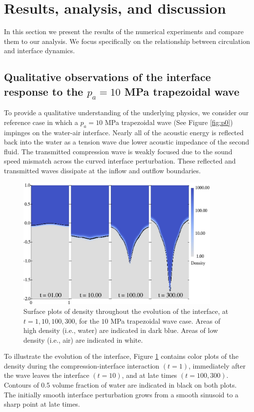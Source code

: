 \section{Results, analysis, and discussion}%
\label{sec:results}%
%
In this section we present the results of the numerical experiments
and compare them to our analysis. We focus specifically on the
relationship between circulation and interface dynamics.
%
%
\subsection{Qualitative observations of the interface response to the $p_a=10$ MPa trapezoidal wave}
\label{subsec:Qualitative}
To provide a qualitative understanding of the underlying physics, we
consider our reference case in which a $p_a=10$ MPa trapezoidal wave
(See Figure \ref{fig:p0}) impinges on the water-air interface. Nearly
all of the acoustic energy is reflected back into the
water as a tension wave due lower acoustic impedance of the second
fluid. The transmitted compression wave is weakly focused due to the sound
speed mismatch across the curved interface perturbation. These
reflected and transmitted waves dissipate at the inflow and outflow
boundaries.
%
\begin{figure}[h] 
  \centering
\includegraphics[width=0.9\textwidth]{./figs/lung_figs/snapshots_density_t1}
\caption[The evolution of the acoustically perturbed interface]
{Surface plots of density throughout the evolution of the interface,
  at $t=1, 10, 100, 300$, for the $10$ MPa trapezoidal wave
  case. Areas of high density (i.e., water) are indicated in dark
  blue. Areas of low density (i.e., air) are indicated in white.}
  \label{fig:interface_snapshots}
\end{figure}
%
To illustrate the evolution of the interface, Figure
\ref{fig:interface_snapshots} contains color plots of the density
during the compression-interface interaction $(t=1)$, immediately
after the wave leaves the interface $(t=10)$, and at late times
$(t=100, 300)$. Contours of 0.5 volume fraction of water are indicated
in black on both plots. The initially smooth interface perturbation
grows from a smooth sinusoid to a sharp point at late times.


